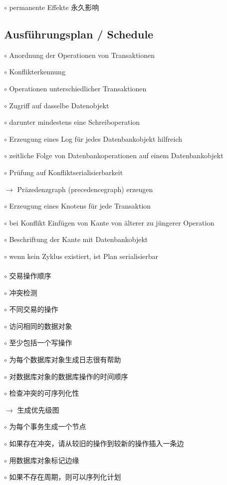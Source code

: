 \documentclass[fleqn]{article}
\begin{document}
$\circ$ permanente Effekte 永久影响

\subsection{Ausführungsplan / Schedule}

\noindent$\circ$ Anordnung der Operationen von Transaktionen

\noindent$\circ$ Konflikterkennung

$\circ$ Operationen unterschiedlicher Transaktionen

$\circ$ Zugriff auf dasselbe Datenobjekt

$\circ$ darunter mindestens eine Schreiboperation

$\circ$ Erzeugung eines Log für jedes Datenbankobjekt hilfreich

\indent\indent$\circ$ zeitliche Folge von Datenbankoperationen auf einem Datenbankobjekt

\noindent$\circ$ Prüfung auf Konfliktserialisierbarkeit

\noindent$\rightarrow$ Präzedenzgraph (precedencegraph) erzeugen

$\circ$ Erzeugung eines Knotens für jede Transaktion

$\circ$ bei Konflikt Einfügen von Kante von älterer zu jüngerer Operation

$\circ$ Beschriftung der Kante mit Datenbankobjekt

$\circ$ wenn kein Zyklus existiert, ist Plan serialisierbar
\\
\\
\noindent$\circ$ 交易操作顺序

\noindent$\circ$ 冲突检测

$\circ$ 不同交易的操作

$\circ$ 访问相同的数据对象

$\circ$ 至少包括一个写操作

$\circ$ 为每个数据库对象生成日志很有帮助

\indent\indent$\circ$ 对数据库对象的数据库操作的时间顺序


\noindent$\circ$ 检查冲突的可序列化性

\noindent$\rightarrow$ 生成优先级图

$\circ$ 为每个事务生成一个节点

$\circ$ 如果存在冲突，请从较旧的操作到较新的操作插入一条边

$\circ$ 用数据库对象标记边缘

$\circ$ 如果不存在周期，则可以序列化计划
\end{document}
